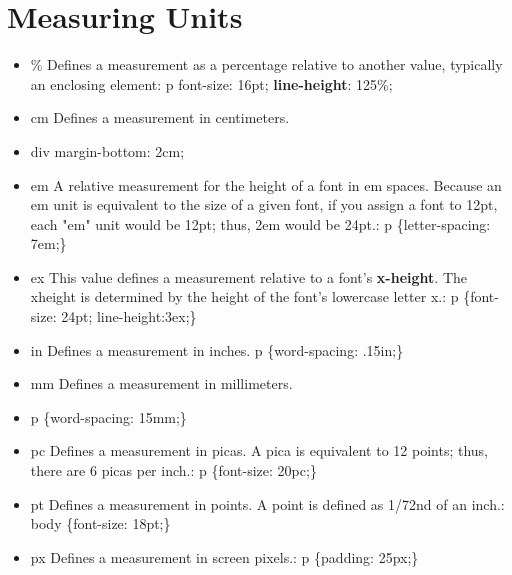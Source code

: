\documentclass{report}
\begin{document}
    \section{\LARGE Measuring Units}
    \bigbreak \noindent 
    \begin{itemize}
        \item \% Defines a measurement as a percentage relative to another value, typically an enclosing element: p {font-size: 16pt; \textbf{line-height}: 125\%;}
            \item cm Defines a measurement in centimeters.
            \item div {margin-bottom: 2cm;}
            \item em A relative measurement for the height of a font in em spaces. Because an em unit is equivalent to the size of a given font, if you assign a font to 12pt, each "em" unit would be 12pt; thus, 2em would be 24pt.: p \{letter-spacing: 7em;\}
            \item ex This value defines a measurement relative to a font's \textbf{x-height}. The xheight is determined by the height of the font's lowercase letter x.: p \{font-size: 24pt; line-height:3ex;\}
            \item in Defines a measurement in inches. p \{word-spacing: .15in;\}
            \item mm Defines a measurement in millimeters.
            \item p \{word-spacing: 15mm;\}
            \item pc Defines a measurement in picas. A pica is equivalent to 12 points; thus, there are 6 picas per inch.: p \{font-size: 20pc;\}
            \item pt Defines a measurement in points. A point is defined as 1/72nd of an inch.: body \{font-size: 18pt;\}
            \item px Defines a measurement in screen pixels.: p \{padding: 25px;\}
    \end{itemize}
\end{document}
